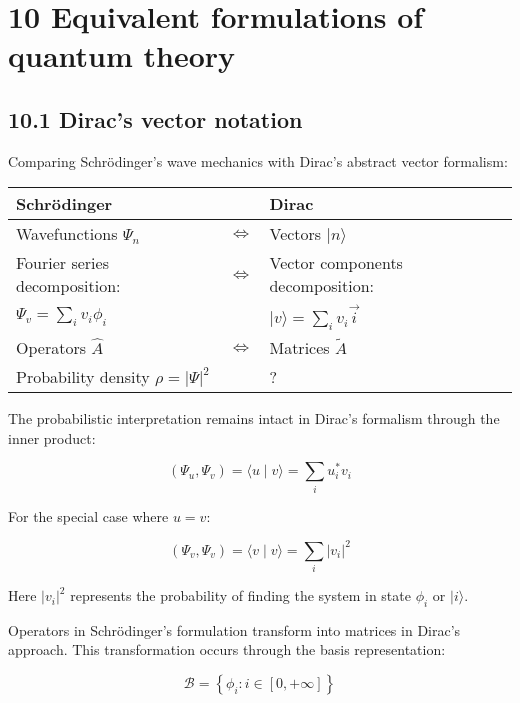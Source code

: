\documentclass[italian]{HKNdocument}
\begin{document}
\section*{10 Equivalent formulations of quantum theory}
\subsection*{10.1 Dirac's vector notation}

Comparing Schrödinger's wave mechanics with Dirac's abstract vector formalism:

\begin{center}
\begin{tabular}{|l|l|l|}
\hline
Schrödinger &  & Dirac \\
\hline
Wavefunctions $\Psi_{n}$ & $\Longleftrightarrow$ & Vectors $|n\rangle$ \\
\hline
Fourier series decomposition: & $\Longleftrightarrow$ & Vector components decomposition: \\
\hline
$\Psi_{v}=\sum_{i} v_{i} \phi_{i}$ &  & $|v\rangle=\sum_{i} v_{i} \vec{i}$ \\
\hline
Operators $\hat{A}$ & $\Longleftrightarrow$ & Matrices $\tilde{A}$ \\
\hline
Probability density $\rho=|\Psi|^{2}$ &  & ? \\
\hline
\end{tabular}
\end{center}

The probabilistic interpretation remains intact in Dirac's formalism through the inner product:

\begin{equation*}
\left(\Psi_{u}, \Psi_{v}\right)=\langle u \mid v\rangle=\sum_{i} u_{i}^{*} v_{i} \tag{10.1}
\end{equation*}

For the special case where $u=v$:

\begin{equation*}
\left(\Psi_{v}, \Psi_{v}\right)=\langle v \mid v\rangle=\sum_{i}\left|v_{i}\right|^{2} \tag{10.2}
\end{equation*}

Here $\left|v_{i}\right|^{2}$ represents the probability of finding the system in state $\phi_{i}$ or $|i\rangle$.

Operators in Schrödinger's formulation transform into matrices in Dirac's approach. This transformation occurs through the basis representation:

\begin{equation*}
\mathcal{B}=\left\{\phi_{i}: i \in[0,+\infty]\right\} \tag{10.3}
\end{equation*}
\end{document}
